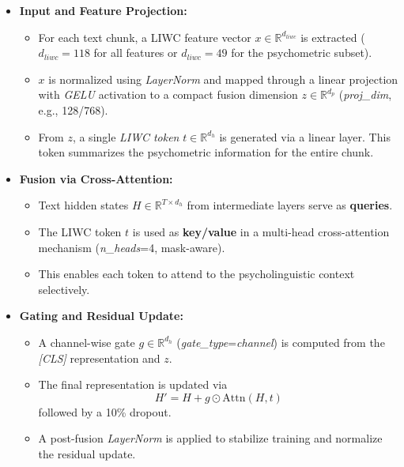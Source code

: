 \begin{itemize}
    \item \textbf{Input and Feature Projection:}
    \begin{itemize}
        \item For each text chunk, a LIWC feature vector \(x \in \mathbb{R}^{d_{liwc}}\) is extracted 
        (\(d_{liwc}=118\) for all features or \(d_{liwc}=49\) for the psychometric subset).
        \item \(x\) is normalized using \textit{LayerNorm} and mapped through a linear projection with \textit{GELU} activation to a compact fusion dimension \(z \in \mathbb{R}^{d_p}\) (\textit{proj\_dim}, e.g., 128/768).
        \item From \(z\), a single \emph{LIWC token} \(t \in \mathbb{R}^{d_h}\) is generated via a linear layer. 
        This token summarizes the psychometric information for the entire chunk.
    \end{itemize}

    
    \item \textbf{Fusion via Cross-Attention:}
    \begin{itemize}
        \item Text hidden states \(H \in \mathbb{R}^{T \times d_h}\) from intermediate layers serve as \textbf{queries}.
        \item The LIWC token \(t\) is used as \textbf{key/value} in a multi-head cross-attention mechanism (\textit{n\_heads}=4, mask-aware).
        \item This enables each token to attend to the psycholinguistic context selectively.
    \end{itemize}
    
    \item \textbf{Gating and Residual Update:}
    \begin{itemize}
        \item A channel-wise gate \(g \in \mathbb{R}^{d_h}\) (\textit{gate\_type}=\textit{channel}) is computed from the \textit{[CLS]} representation and \(z\).
        \item The final representation is updated via
        \[
        H' = H + g \odot \mathrm{Attn}(H, t)
        \]
        followed by a 10\% dropout.
        \item A post-fusion \textit{LayerNorm} is applied to stabilize training and normalize the residual update.

    \end{itemize}
    

\end{itemize}
